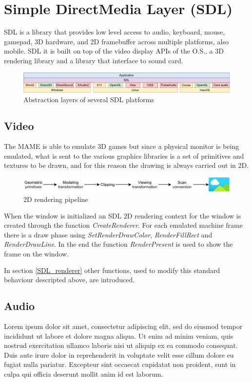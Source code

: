 \section{Simple DirectMedia Layer (SDL)}
SDL is a library that provides low level access to audio, keyboard, mouse, gamepad, 3D hardware, and 2D framebuffer across multiple platforms, also mobile. SDL it is built on top of the video display APIs of the O.S., a 3D rendering library and a library that interface to sound card\cite{SDL_Wiki}.

\begin{figure}[H]
	\includegraphics[width=\linewidth]{immagini/sdl}
	\caption{Abstraction layers of several SDL platforms}
	\label{fig:sdl}
\end{figure}

\subsection{Video}
The MAME is able to emulate 3D games but since a physical monitor is being emulated, what is sent to the various graphics libraries is a set of primitives and textures to be drawn, and for this reason the drawing is always carried out in 2D.

\begin{figure}[H]
	\includegraphics[width=\linewidth]{immagini/rendering_pipeline}
	\caption{2D rendering pipeline}
	\label{fig:rendering_pipeline}
\end{figure}

When the window is initialized an SDL 2D rendering context for the window is created through the function \textit{CreateRenderer}. For each emulated machine frame there is a draw phase using \textit{SetRenderDrawColor}, \textit{RenderFillRect} and \textit{RenderDrawLine}. In the end the function \textit{RenderPresent} is used to show the frame on the window.

In section \ref{SDL_renderer} other functions, used to modify this standard behaviour descripted above, are introduced.


\subsection{Audio}
Lorem ipsum dolor sit amet, consectetur adipiscing elit, sed do eiusmod tempor incididunt ut labore et dolore magna aliqua. Ut enim ad minim veniam, quis nostrud exercitation ullamco laboris nisi ut aliquip ex ea commodo consequat. Duis aute irure dolor in reprehenderit in voluptate velit esse cillum dolore eu fugiat nulla pariatur. Excepteur sint occaecat cupidatat non proident, sunt in culpa qui officia deserunt mollit anim id est laborum.



